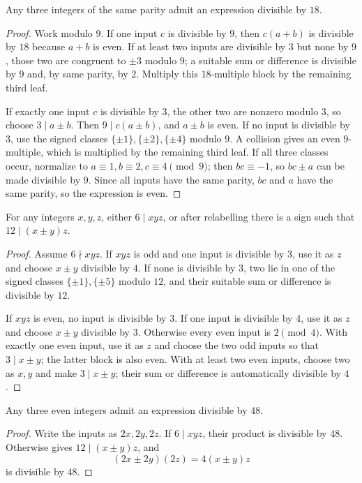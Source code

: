 \begin{theorem}\label{app:three18}
Any three integers of the same parity admit an expression divisible by $18$.
\end{theorem}
\begin{proof}
Work modulo $9$.  If one input $c$ is divisible by $9$, then
$c(a+b)$ is divisible by $18$ because $a+b$ is even.  If at least two inputs
are divisible by $3$ but none by $9$, those two are congruent to $\pm3$
modulo $9$; a suitable sum or difference is divisible by $9$ and, by same
parity, by $2$.  Multiply this $18$-multiple block by the remaining third
leaf.

If exactly one input $c$ is divisible by $3$, the other two are nonzero
modulo $3$, so choose $3\mid a\pm b$.  Then $9\mid c(a\pm b)$, and
$a\pm b$ is even.  If no input is divisible by $3$, use the signed classes
$\{\pm1\},\{\pm2\},\{\pm4\}$ modulo $9$.  A collision gives an even
$9$-multiple, which is multiplied by the remaining third leaf.  If all three
classes occur, normalize to $a\equiv1,b\equiv2,c\equiv4\pmod9$; then
$bc\equiv-1$, so $bc\pm a$ can be made divisible by $9$.  Since all inputs
have the same parity, $bc$ and $a$ have the same parity, so the expression is
even.
\end{proof}

\begin{lemma}\label{app:three48lemma}
For any integers $x,y,z$, either $6\mid xyz$, or after relabelling there is a
sign such that $12\mid(x\pm y)z$.
\end{lemma}
\begin{proof}
Assume $6\nmid xyz$.  If $xyz$ is odd and one input is divisible by $3$, use
it as $z$ and choose $x\pm y$ divisible by $4$.  If none is divisible by
$3$, two lie in one of the signed classes $\{\pm1\},\{\pm5\}$ modulo $12$,
and their suitable sum or difference is divisible by $12$.

If $xyz$ is even, no input is divisible by $3$.  If one input is divisible
by $4$, use it as $z$ and choose $x\pm y$ divisible by $3$.  Otherwise every
even input is $2\pmod4$.  With exactly one even input, use it as $z$ and
choose the two odd inputs so that $3\mid x\pm y$; the latter block is also
even.  With at least two even inputs, choose two as $x,y$ and make
$3\mid x\pm y$; their sum or difference is automatically divisible by $4$.
\end{proof}

\begin{theorem}\label{app:three48}
Any three even integers admit an expression divisible by $48$.
\end{theorem}
\begin{proof}
Write the inputs as $2x,2y,2z$.  If $6\mid xyz$, their product is divisible
by $48$.  Otherwise  gives
$12\mid(x\pm y)z$, and
\[
 (2x\pm2y)(2z)=4(x\pm y)z
\]
is divisible by $48$.
\end{proof}

